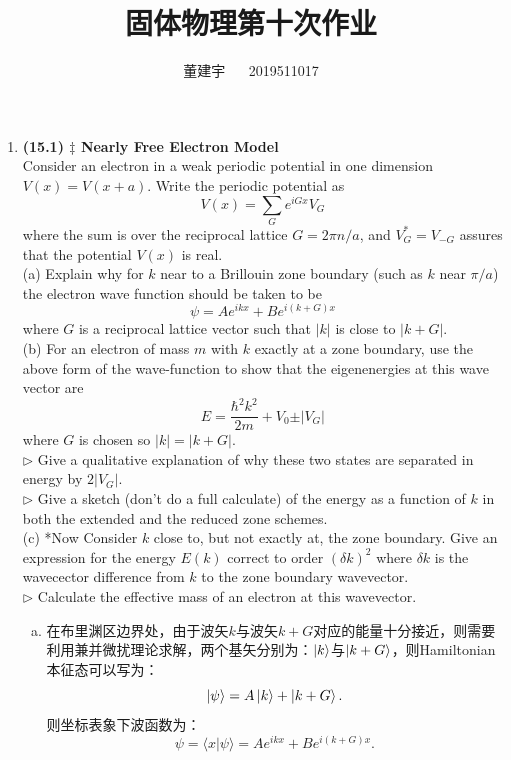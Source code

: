 \documentclass[reqno,a4paper,12pt]{amsart}
\title{固体物理第十次作业}
\author{董建宇 ~~ 2019511017}
\begin{document}
\maketitle

\begin{enumerate}[1.]
\item \textbf{(15.1) $\ddagger$ Nearly Free Electron Model}\\
Consider an electron in a weak periodic potential in one dimension $V(x) = V(x+a)$. Write the periodic potential as 
\[
	V(x) = \sum_{G} e^{iGx} V_G
\]
where the sum is over the reciprocal lattice $G = 2\pi n/a$, and $V_G^* = V_{-G}$ assures that the potential $V(x)$ is real. \\
(a) Explain why for $k$ near to a Brillouin zone boundary (such as $k$ near $\pi/a$) the electron wave function should be taken to be 
\[
	\psi = Ae^{ikx} + Be^{i(k+G)x}
\]
where $G$ is a reciprocal lattice vector such that $\vert k \vert$ is close to $\vert k+G \vert$. \\
(b) For an electron of mass $m$ with $k$ exactly at a zone boundary, use the above form of the wave-function to show that the eigenenergies at this wave vector are 
\[
	E = \frac{\hbar^2k^2}{2m} + V_0 \pm \vert V_G \vert
\]
where $G$ is chosen so $\vert k \vert = \vert k+G \vert$. \\
$\triangleright$ Give a qualitative explanation of why these two states are separated in energy by $2\vert V_G \vert$. \\
$\triangleright$ Give a sketch (don't do a full calculate) of the energy as a function of $k$ in both the extended and the reduced zone schemes. \\
(c) *Now Consider $k$ close to, but not exactly at, the zone boundary. Give an expression for the energy $E(k)$ correct to order $(\delta k)^2$ where $\delta k$ is the wavecector difference from $k$ to the zone boundary wavevector. \\
$\triangleright$ Calculate the effective mass of an electron at this wavevector. 
\begin{tcolorbox}[breakable, colback = black!5!white, colframe = black]
\begin{enumerate}[(a)]
\item 在布里渊区边界处，由于波矢$k$与波矢$k+G$对应的能量十分接近，则需要利用兼并微扰理论求解，两个基矢分别为：$\ket{k}$与$\ket{k+G}$，则Hamiltonian本征态可以写为：
\[
	\ket{\psi} = A\ket{k} + \ket{k+G}.
\]
则坐标表象下波函数为：
\[
	\psi = \langle x \vert \psi \rangle = Ae^{ikx} + Be^{i(k+G)x}.
\]


\end{enumerate}
\end{tcolorbox}
\end{enumerate}
\end{document}
